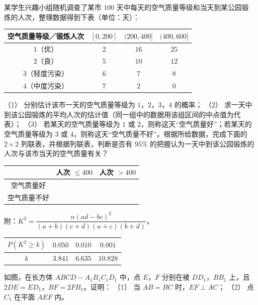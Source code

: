 \begin{question}
某学生兴趣小组随机调查了某市 $100$ 天中每天的空气质量等级和当天到某公园锻炼的人次，整理数据得到下表（单位：天）：

\begin{center}
\begin{tabular}{cccc}
\toprule
空气质量等级／锻炼人次 & $[0,200]$ & $(200,400]$ & $(400,600]$ \\
\midrule
$1$（优） & $2$ & $16$ & $25$ \\
$2$（良） & $5$ & $10$ & $12$ \\
$3$（轻度污染） & $6$ & $7$ & $8$ \\
$4$（中度污染） & $7$ & $2$ & $0$ \\
\bottomrule
\end{tabular}
\end{center}

（1） 分别估计该市一天的空气质量等级为 $1$，$2$，$3$，$4$ 的概率；
（2） 求一天中到该公园锻炼的平均人次的估计值（同一组中的数据用该组区间的中点值为代表）；
（3） 若某天的空气质量等级为 $1$ 或 $2$，则称这天“空气质量好”；若某天的空气质量等级为 $3$ 或 $4$，则称这天“空气质量不好”。根据所给数据，完成下面的 $2\times2$ 列联表，并根据列联表，判断是否有 $95\%$ 的把握认为一天中到该公园锻炼的人次与该市当天的空气质量有关？

\begin{center}
\begin{tabular}{ccc}
\toprule
 & 人次 $\leqslant400$ & 人次 $>400$ \\
\midrule
空气质量好 &  &  \\
空气质量不好 &  &  \\
\bottomrule
\end{tabular}
\end{center}

附：$K^2=\dfrac{n(ad-bc)^2}{(a+b)(c+d)(a+c)(b+d)}$，

\begin{center}
\begin{tabular}{cccc}
\toprule
$P(K^2\geqslant k)$ & $0.050$ & $0.010$ & $0.001$ \\
\midrule
$k$ & $3.841$ & $6.635$ & $10.828$ \\
\bottomrule
\end{tabular}
\end{center}

\Needspace{0.4\textheight}
\end{question}
\begin{question}
如图，在长方体 $ABCD-A_1B_1C_1D_1$ 中，点 $E$，$F$ 分别在棱 $DD_1$，$BB_1$ 上，且 $2DE=ED_1$，$BF=2FB_1$。证明：
（1） 当 $AB=BC$ 时，$EF\perp AC$；
（2） 点 $C_1$ 在平面 $AEF$ 内。
\nopagebreak[4]
\begin{center}\end{center}
\nopagebreak[4]
\end{question}
